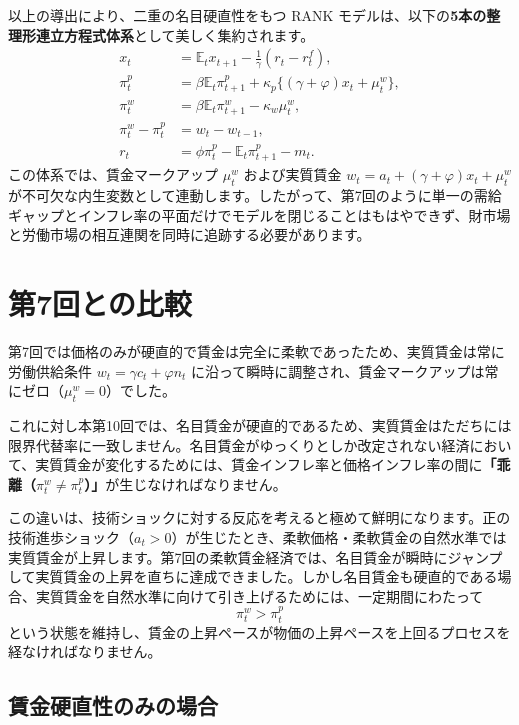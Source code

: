 \documentclass[
  japanese,
  lualatex,
  ja=standard,
  12pt,
  a4paper]{ltjsarticle}
\begin{document}
以上の導出により、二重の名目硬直性をもつ RANK
モデルは、以下の\textbf{5本の整理形連立方程式体系}として美しく集約されます。
\[
\begin{aligned}
x_t
&=
\mathbb{E}_t x_{t+1}
-
\frac{1}{\gamma}(r_t-r_t^f),
\\
\pi^p_t
&=
\beta\mathbb{E}_t\pi^p_{t+1}
+
\kappa_p\{(\gamma+\varphi)x_t+\mu^w_t\},
\\
\pi^w_t
&=
\beta\mathbb{E}_t\pi^w_{t+1}
-
\kappa_w\mu^w_t,
\\
\pi^w_t-\pi^p_t
&=
w_t-w_{t-1},
\\
r_t
&=
\phi\pi^p_t
-
\mathbb{E}_t\pi^p_{t+1}
-
m_t.
\end{aligned}
\] この体系では、賃金マークアップ \(\mu_t^w\) および実質賃金
\(w_t = a_t + (\gamma+\varphi)x_t + \mu_t^w\)
が不可欠な内生変数として連動します。したがって、第7回のように単一の需給ギャップとインフレ率の平面だけでモデルを閉じることはもはやできず、財市場と労働市場の相互連関を同時に追跡する必要があります。

\section{第7回との比較}\label{ux7b2c7ux56deux3068ux306eux6bd4ux8f03}

第7回では価格のみが硬直的で賃金は完全に柔軟であったため、実質賃金は常に労働供給条件
\(w_t = \gamma c_t + \varphi n_t\)
に沿って瞬時に調整され、賃金マークアップは常にゼロ（\(\mu_t^w=0\)）でした。

これに対し本第10回では、名目賃金が硬直的であるため、実質賃金はただちには限界代替率に一致しません。名目賃金がゆっくりとしか改定されない経済において、実質賃金が変化するためには、賃金インフレ率と価格インフレ率の間に\textbf{「乖離（\(\pi_t^w \neq \pi_t^p\)）」}が生じなければなりません。

この違いは、技術ショックに対する反応を考えると極めて鮮明になります。正の技術進歩ショック（\(a_t>0\)）が生じたとき、柔軟価格・柔軟賃金の自然水準では実質賃金が上昇します。第7回の柔軟賃金経済では、名目賃金が瞬時にジャンプして実質賃金の上昇を直ちに達成できました。しかし名目賃金も硬直的である場合、実質賃金を自然水準に向けて引き上げるためには、一定期間にわたって
\[
\pi_t^w > \pi_t^p
\]
という状態を維持し、賃金の上昇ペースが物価の上昇ペースを上回るプロセスを経なければなりません。

\subsection{賃金硬直性のみの場合}\label{ux8cc3ux91d1ux786cux76f4ux6027ux306eux307fux306eux5834ux5408}
\end{document}
